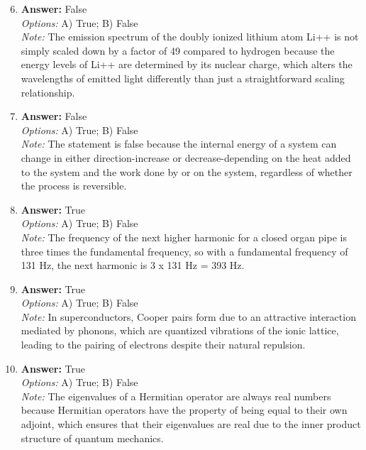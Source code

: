 \documentclass[12pt]{article}
\begin{document}
\begin{enumerate}[label=\arabic*.]
\setcounter{enumi}{5}
\item \textbf{Answer:} False
\\ \textit{Options:} A) True; B) False
\\ \textit{Note:} The emission spectrum of the doubly ionized lithium atom Li++ is not simply scaled down by a factor of 49 compared to hydrogen because the energy levels of Li++ are determined by its nuclear charge, which alters the wavelengths of emitted light differently than just a straightforward scaling relationship.
\item \textbf{Answer:} False
\\ \textit{Options:} A) True; B) False
\\ \textit{Note:} The statement is false because the internal energy of a system can change in either direction-increase or decrease-depending on the heat added to the system and the work done by or on the system, regardless of whether the process is reversible.
\item \textbf{Answer:} True
\\ \textit{Options:} A) True; B) False
\\ \textit{Note:} The frequency of the next higher harmonic for a closed organ pipe is three times the fundamental frequency, so with a fundamental frequency of 131 Hz, the next harmonic is 3 x 131 Hz = 393 Hz.
\item \textbf{Answer:} True
\\ \textit{Options:} A) True; B) False
\\ \textit{Note:} In superconductors, Cooper pairs form due to an attractive interaction mediated by phonons, which are quantized vibrations of the ionic lattice, leading to the pairing of electrons despite their natural repulsion.
\item \textbf{Answer:} True
\\ \textit{Options:} A) True; B) False
\\ \textit{Note:} The eigenvalues of a Hermitian operator are always real numbers because Hermitian operators have the property of being equal to their own adjoint, which ensures that their eigenvalues are real due to the inner product structure of quantum mechanics.
\end{enumerate}
\end{document}
